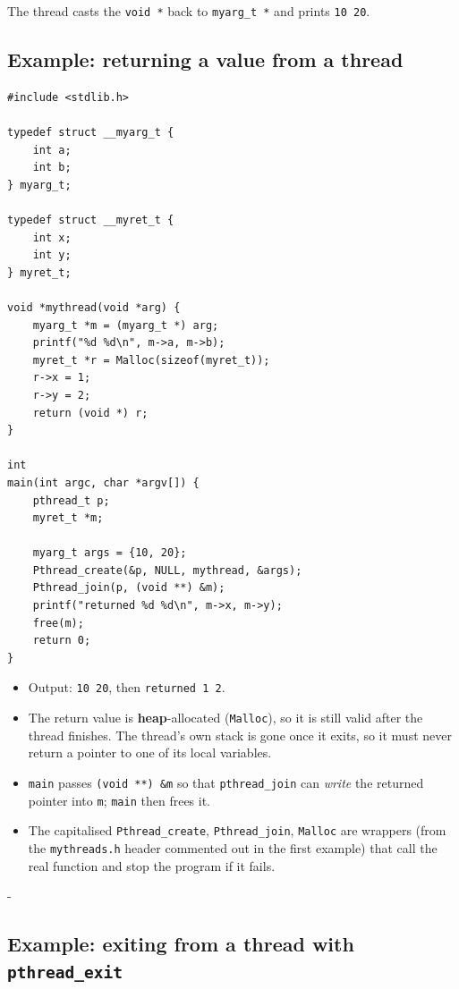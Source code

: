 \documentclass[11pt,a4paper]{article}
\makeatletter
\newcommand{\keepspace}[1]{\par\penalty-100\begingroup
  \setlength{\dimen@}{#1}\dimen@ii\pagegoal\advance\dimen@ii-\pagetotal
  \ifdim\dimen@>\dimen@ii\ifdim\dimen@ii>\z@\vfil\fi\break\fi\endgroup}
\makeatother
\begin{document}
The thread casts the \texttt{void *} back to \texttt{myarg\_t *} and
prints \texttt{10 20}.

\subsection{Example: returning a value from a thread}

\begin{lstlisting}[firstnumber=4]
#include <stdlib.h>

typedef struct __myarg_t {
    int a;
    int b;
} myarg_t;

typedef struct __myret_t {
    int x;
    int y;
} myret_t;

void *mythread(void *arg) {
    myarg_t *m = (myarg_t *) arg;
    printf("%d %d\n", m->a, m->b);
    myret_t *r = Malloc(sizeof(myret_t));
    r->x = 1;
    r->y = 2;
    return (void *) r;
}

int
main(int argc, char *argv[]) {
    pthread_t p;
    myret_t *m;

    myarg_t args = {10, 20};
    Pthread_create(&p, NULL, mythread, &args);
    Pthread_join(p, (void **) &m);
    printf("returned %d %d\n", m->x, m->y);
    free(m);
    return 0;
}
\end{lstlisting}

\begin{itemize}
  \item Output: \texttt{10 20}, then \texttt{returned 1 2}.
  \item The return value is \textbf{heap}-allocated (\texttt{Malloc}), so it
        is still valid after the thread finishes. The thread's own stack is
        gone once it exits, so it must never return a pointer to one of its
        local variables.
  \item \texttt{main} passes \texttt{(void **) \&m} so that
        \texttt{pthread\_join} can \emph{write} the returned pointer into
        \texttt{m}; \texttt{main} then frees it.
  \item The capitalised \texttt{Pthread\_create}, \texttt{Pthread\_join},
        \texttt{Malloc} are wrappers (from the \texttt{mythreads.h} header
        commented out in the first example) that call the real function and
        stop the program if it fails.
\end{itemize}

\keepspace{34\baselineskip}
\subsection{Example: exiting from a thread with \texttt{pthread\_exit}}
\end{document}
